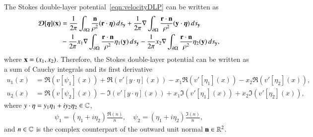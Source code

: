 \documentclass[preprint,10pt]{elsarticle}
\begin{document}
The Stokes double-layer potential~\eqref{eqn:velocityDLP} can be written
as~\cite{bar-wu-vee2015}
\begin{equation}
  \label{eqn:Stokes2Laplace}
  \begin{aligned}
    {\boldsymbol{\mathcal D}}[{\boldsymbol\eta}]({\mathbf{x}}) &= 
      \frac{1}{2\pi} \int_{{\partial}\Omega} 
        \frac{{\mathbf{n}}}{\rho^2} ({\mathbf{r}} \cdot {\boldsymbol\eta}) \, ds_{\mathbf{y}} + 
      \frac{1}{2\pi} \nabla \int_{{\partial}\Omega}
        \frac{{\mathbf{r}} \cdot {\mathbf{n}}}{\rho^2} ({\mathbf{y}} \cdot {\boldsymbol\eta}) \, ds_{\mathbf{y}} \\
      &- \frac{1}{2\pi} x_1 \nabla \int_{{\partial}\Omega}
        \frac{{\mathbf{r}} \cdot {\mathbf{n}}}{\rho^2}\eta_1({\mathbf{y}}) \, ds_{\mathbf{y}} -
      \frac{1}{2\pi} x_2 \nabla \int_{{\partial}\Omega}
        \frac{{\mathbf{r}} \cdot {\mathbf{n}}}{\rho^2}\eta_2({\mathbf{y}}) \, ds_{\mathbf{y}},
  \end{aligned}
\end{equation}
where ${\mathbf{x}} = (x_1,x_2)$. Therefore, the Stokes double-layer potential
can be written as a sum of Cauchy integrals and its first derivative 
\begin{equation}
  \begin{aligned}
    u_1(x) &= \Re (v[\psi_1](x)) + \Re (v'[y\cdot\eta](x)) 
             -x_1\Re (v'[\eta_1](x)) - x_2\Re (v'[\eta_2](x)), \\
    u_2(x) &= \Re (v[\psi_2](x)) - \Im (v'[y\cdot\eta](x)) 
         +x_1\Im (v'[\eta_1](x)) + x_2\Im (v'[\eta_2](x)),
  \end{aligned}
  \label{eqn:cauchyVelocity}
\end{equation}
where $y \cdot \eta = y_1 \eta_1 + i y_2 \eta_2 \in {\mathbb{C}}$, 
\begin{align} 
  \psi_1=(\eta_1+i\eta_2)\frac{\Re(n)}{n}, \quad
  \psi_2=(\eta_1+i\eta_2)\frac{\Im(n)}{n},
\end{align}
and $n \in {\mathbb{C}}$ is the complex counterpart of the outward unit normal
${\mathbf{n}} \in {\mathbb{R}}^2$.

\end{document}
